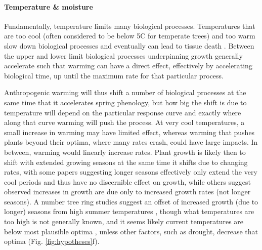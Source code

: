 \documentclass[11pt]{article}
\begin{document}
\paragraph{Temperature \& moisture} %

Fundamentally, temperature limits many biological processes. Temperatures that are too cool (often considered to be below 5\degree C for temperate trees) and too warm \citep[an area of active research,][see also Fig. \ref{fig:temperaturecomplex}]{martinez2008hot,cabon2022cross} slow down biological processes and eventually can lead to tissue death \citep{larcher1980,kramer2012book}. Between the upper and lower limit biological processes underpinning growth generally accelerate such that warming can have a direct effect, effectively by accelerating biological time, up until the maximum rate for that particular process.

Anthropogenic warming will thus shift a number of biological processes at the same time that it accelerates spring phenology, but how big the shift is due to temperature will depend on the particular response curve and exactly where along that curve warming will push the process. At very cool temperatures, a small increase in warming may have limited effect, whereas warming that pushes plants beyond their optima, where many rates crash, could have large impacts. In between, warming would linearly increase rates. Plant growth is likely then to shift with extended growing seasons at the same time it shifts due to changing rates, with some papers suggesting longer seasons effectively only extend the very cool periods and thus have no discernible effect on growth, while others suggest observed increases in growth are due only to increased growth rates (not longer seasons). A number tree ring studies suggest an offset of increased growth (due to longer) seasons from high summer temperatures \citep{gantois2022new,dow2022warm}, though what temperatures are too high is not generally known, and it seems likely current temperatures are below most plausible optima \citep{schaber2002evaluation}, unless other factors, such as drought, decrease that optima (Fig. \ref{fig:hypotheses}f). 
\end{document}
